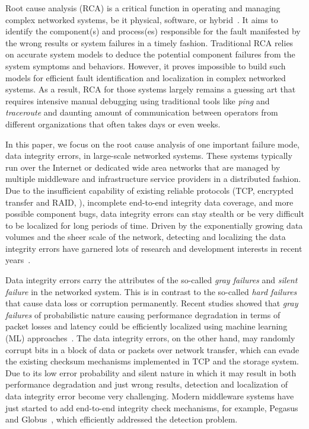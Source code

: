 Root cause analysis (RCA) is a critical function in operating and managing complex networked systems, be it physical, software, or hybrid~\cite{RCA-Review-2017}.
It aims to identify the component(s) and process(es) responsible for the fault manifested by the wrong results or system failures in a timely fashion.
Traditional RCA relies on accurate system models to deduce the potential component failures from the system symptoms and behaviors.
However,  it proves impossible to build such models for efficient fault identification and localization in complex networked systems. 
As a result, RCA for those systems largely remains a guessing art that requires intensive manual debugging using traditional tools 
like {\it ping} and {\it traceroute} and daunting amount of communication between operators from different organizations 
that often takes days or even weeks.

In this paper, we focus on the root cause analysis of one important failure mode, data integrity errors, in large-scale networked systems. These systems typically run 
over the Internet or dedicated wide area networks that are managed by multiple middleware and infrastructure service providers in a distributed fashion. 
Due to the insufficient capability of existing reliable protocols (TCP, encrypted transfer and RAID, \et),  incomplete end-to-end integrity data coverage, and 
more possible component bugs, data integrity errors can stay stealth or be very difficult to be localized for long periods of time.  
Driven by the exponentially growing data volumes and the sheer scale of the network, detecting and localizing the data integrity errors have garnered 
lots of research and development interests in recent years~\cite{tcp:ccr2000,swip:pearc:2019}. 

Data integrity errors carry the attributes of the so-called {\it gray failures} and {\it silent failure} in the networked system. This is in contrast to the so-called {\it hard failures} 
that cause data loss or corruption permanently. Recent studies showed that {\it gray failures} of probabilistic nature  causing performance degradation in terms 
of packet losses and latency could be efficiently localized using machine learning (ML) approaches~\cite{GrayFailure:2017,DeepView:NSDI18}. The data integrity errors, 
on the other hand, may randomly corrupt bits in a block of data or packets over network transfer, which can evade the existing checksum mechanisms implemented in TCP 
and the storage system. Due to its low error probability and silent nature in which it may result in both performance degradation and just wrong results, detection and localization 
of data integrity error become very challenging. Modern middleware systems have just started to add end-to-end integrity check mechanisms, 
for example, Pegasus~\cite{deelman-fgcs-2015} and Globus~\cite{IntegrityVerification:DataTransfer}, which efficiently addressed the detection problem. 

